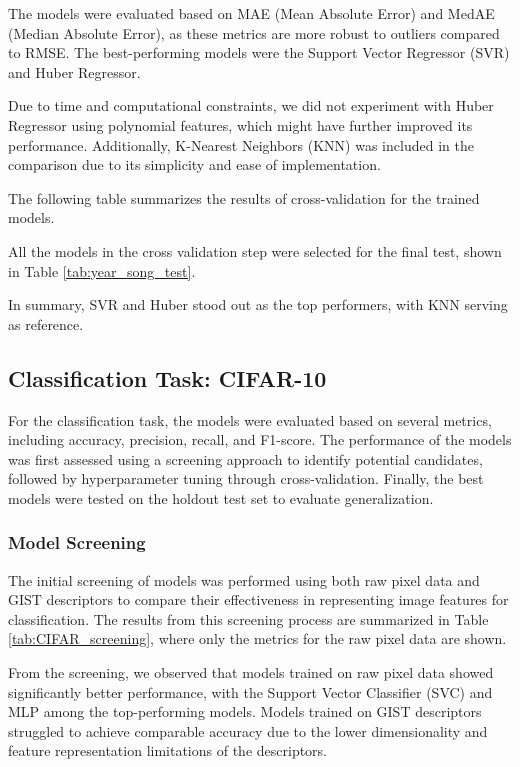 \documentclass[twocolumn]{article}
\begin{document}


The models were evaluated based on MAE (Mean Absolute Error) and MedAE (Median Absolute Error),
 as these metrics are more robust to outliers compared to RMSE. 
 The best-performing models were the Support Vector Regressor (SVR) 
 and Huber Regressor.

Due to time and computational constraints, we did not experiment with Huber Regressor using polynomial features, which might have further improved its performance. 
Additionally, K-Nearest Neighbors (KNN) was included in the comparison due to 
its simplicity and ease of implementation.

The following table summarizes the results of cross-validation for the trained models.



All the models in the cross validation step were selected for the final test, shown in Table \ref{tab:year_song_test}.




In summary, SVR and Huber stood out as the top performers, 
with KNN serving as reference.

\subsection{Classification Task: CIFAR-10}
For the classification task, the models were evaluated based on several metrics, 
including accuracy, precision, recall, and F1-score. The performance of the models was 
first assessed using a screening approach to identify potential candidates, followed by 
hyperparameter tuning through cross-validation. Finally, the best models were tested on 
the holdout test set to evaluate generalization.

\subsubsection{Model Screening}
The initial screening of models was performed using both raw pixel data and GIST
 descriptors to compare their effectiveness in representing image features for classification.
  The results from this screening process are summarized in Table \ref{tab:CIFAR_screening}, 
  where only the metrics for the raw pixel data are shown. 



From the screening, we observed that models trained on raw pixel data showed significantly
 better performance, with the Support Vector Classifier (SVC) and MLP among the top-performing models. 
 Models trained on GIST descriptors struggled to achieve comparable accuracy due
  to the lower dimensionality and feature representation limitations of the descriptors.
\end{document}
